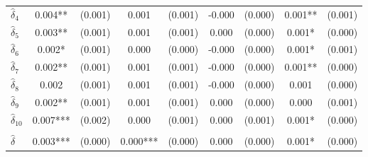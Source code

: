 {\begin{tabular}{l*{4}{cc}}
$\hat{\delta}_4$&       0.004** &     (0.001)&       0.001   &     (0.001)&      -0.000   &     (0.000)&       0.001** &     (0.001)\\
$\hat{\delta}_5$&       0.003** &     (0.001)&       0.001   &     (0.001)&       0.000   &     (0.000)&       0.001*  &     (0.000)\\
$\hat{\delta}_6$&       0.002*  &     (0.001)&       0.000   &     (0.000)&      -0.000   &     (0.000)&       0.001*  &     (0.001)\\
$\hat{\delta}_7$&       0.002** &     (0.001)&       0.001   &     (0.001)&      -0.000   &     (0.000)&       0.001** &     (0.000)\\
$\hat{\delta}_8$&       0.002   &     (0.001)&       0.001   &     (0.001)&      -0.000   &     (0.000)&       0.001   &     (0.000)\\
$\hat{\delta}_9$&       0.002** &     (0.001)&       0.001   &     (0.001)&       0.000   &     (0.000)&       0.000   &     (0.001)\\
$\hat{\delta}_{10}$&       0.007***&     (0.002)&       0.000   &     (0.001)&       0.000   &     (0.001)&       0.001*  &     (0.000)\\
\addlinespace&               &            &               &            &               &            &               &            \\
$\hat{\delta}$&       0.003***&     (0.000)&       0.000***&     (0.000)&       0.000   &     (0.000)&       0.001*  &     (0.000)\\
\bottomrule
\end{tabular}
}

